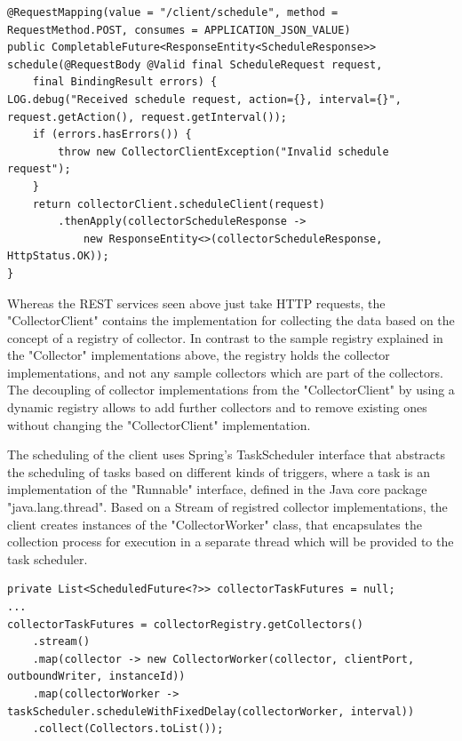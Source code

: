 \begin{lstlisting}[caption={"ScheduleController", REST endpoint}, captionpos=b, label={lst:schedule-endpoint}]
@RequestMapping(value = "/client/schedule", method = RequestMethod.POST, consumes = APPLICATION_JSON_VALUE)
public CompletableFuture<ResponseEntity<ScheduleResponse>> schedule(@RequestBody @Valid final ScheduleRequest request,
    final BindingResult errors) {
LOG.debug("Received schedule request, action={}, interval={}", request.getAction(), request.getInterval());
    if (errors.hasErrors()) {
        throw new CollectorClientException("Invalid schedule request");
    }
    return collectorClient.scheduleClient(request)
        .thenApply(collectorScheduleResponse ->
            new ResponseEntity<>(collectorScheduleResponse, HttpStatus.OK));
}
\end{lstlisting}

Whereas the REST services seen above just take HTTP requests, the "CollectorClient" contains the implementation for
collecting the data based on the concept of a registry of collector. In contrast to the sample registry explained in the
"Collector" implementations above, the registry holds the collector implementations, and not any sample collectors which
are part of the collectors. The decoupling of collector implementations from the "CollectorClient" by using a dynamic registry
allows to add further collectors and to remove existing ones without changing the "CollectorClient" implementation.

The scheduling of the client uses Spring's TaskScheduler interface that abstracts the scheduling of tasks based on different
kinds of triggers, where a task is an implementation of the "Runnable" interface, defined in the Java core package "java.lang.thread".
Based on a Stream of registred collector implementations, the client creates instances of the "CollectorWorker" class, that
encapsulates the collection process for execution in a separate thread which will be provided to the task scheduler.

\begin{lstlisting}[caption={"CollectorClient", collector registry}, captionpos=b, label={lst:collector-client-registry}]
private List<ScheduledFuture<?>> collectorTaskFutures = null;
...
collectorTaskFutures = collectorRegistry.getCollectors()
    .stream()
    .map(collector -> new CollectorWorker(collector, clientPort, outboundWriter, instanceId))
    .map(collectorWorker -> taskScheduler.scheduleWithFixedDelay(collectorWorker, interval))
    .collect(Collectors.toList());
\end{lstlisting}


